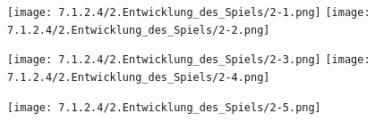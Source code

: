 \documentclass{scrartcl}   %
\begin{document}
\begin{figure}[ht]
	\texttt{[image: 7.1.2.4/2.Entwicklung\_des\_Spiels/2-1.png]}
	\hspace{0.5cm}
	\texttt{[image: 7.1.2.4/2.Entwicklung\_des\_Spiels/2-2.png]}
\end{figure}

\begin{figure}[ht]
	\texttt{[image: 7.1.2.4/2.Entwicklung\_des\_Spiels/2-3.png]}
	\hspace{0.5cm}
	\texttt{[image: 7.1.2.4/2.Entwicklung\_des\_Spiels/2-4.png]}
\end{figure}

\begin{figure}[ht]
	\texttt{[image: 7.1.2.4/2.Entwicklung\_des\_Spiels/2-5.png]}
\end{figure}

\newpage
\end{document}
